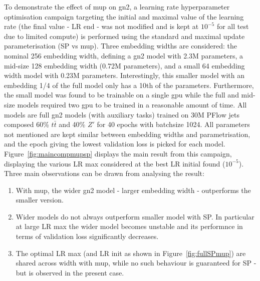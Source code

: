 To demonstrate the effect of \gls{mup} on \gls{gn2}, a learning rate hyperparameter optimisation campaign targeting the initial and maximal value of the learning rate (the final value - LR end - was not modified and is kept at $10^{-5}$ for all test due to limited compute) is performed using the standard and maximal update parameterisation (SP vs \gls{mup}). Three embedding widths are considered: the nominal 256 embedding width, defining a \gls{gn2} model with 2.3M parameters, a mid-size 128 embedding width (0.72M parameters), and a small 64 embedding width model with 0.23M parameters. Interestingly, this smaller model with an embedding 1/4 of the full model only has a 10th of the parameters. Furthermore, the small model was found to be trainable on a single \gls{gpu} while the full and mid-size models required two \gls{gpu} to be trained in a reasonable amount of time. All models are full \gls{gn2} models (with auxiliary tasks) trained on 30M PFlow jets composed 60\% $t\bar{t}$ and 40\% $Z'$ for 40 epochs with batchsize 1024. All parameters not mentioned are kept similar between embedding widths and parametrisation, and the epoch giving the lowest validation loss is picked for each model. Figure~\ref{fig:maincompmupsp} displays the main result from this campaign, displaying the various LR max considered at the best LR initial found ($10^{-5}$). Three main observations can be drawn from analysing the result:
\begin{enumerate}
  \item With \gls{mup}, the wider \gls{gn2} model - larger embedding width - outperforms the smaller version. 
  \item Wider models do not always outperform smaller model with SP. In particular at large LR max the wider model becomes unstable and its performnce in terms of validation loss significantly decreases.
  \item The optimal LR max (and LR init as shown in Figure~\ref{fig:fullSPmup}) are shared across width with \gls{mup}, while no such behaviour is guaranteed for SP - but is observed in the present case.
\end{enumerate}


